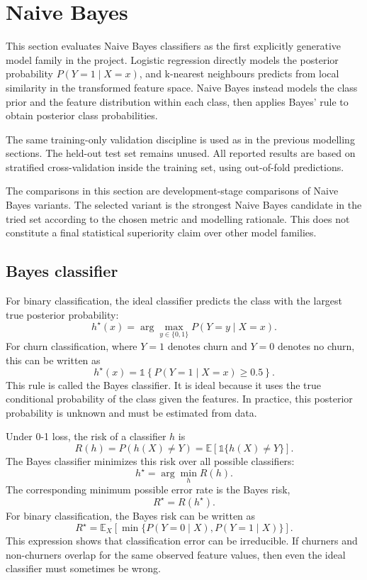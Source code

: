 \newpage
\section{Naive Bayes}
\label{sec:naive-bayes}

This section evaluates Naive Bayes classifiers as the first explicitly generative model family in the project. Logistic regression directly models the posterior probability \(P(Y=1\mid X=x)\), and k-nearest neighbours predicts from local similarity in the transformed feature space. Naive Bayes instead models the class prior and the feature distribution within each class, then applies Bayes' rule to obtain posterior class probabilities.

The same training-only validation discipline is used as in the previous modelling sections. The held-out test set remains unused. All reported results are based on stratified cross-validation inside the training set, using out-of-fold predictions.

The comparisons in this section are development-stage comparisons of Naive Bayes variants. The selected variant is the strongest Naive Bayes candidate in the tried set according to the chosen metric and modelling rationale. This does not constitute a final statistical superiority claim over other model families.

\subsection{Bayes classifier}

For binary classification, the ideal classifier predicts the class with the largest true posterior probability:
\[
h^\star(x)
=
\arg\max_{y\in\{0,1\}}
P(Y=y\mid X=x).
\]
For churn classification, where \(Y=1\) denotes churn and \(Y=0\) denotes no churn, this can be written as
\[
h^\star(x)
=
\mathbb{1}
\left\{
P(Y=1\mid X=x)\geq 0.5
\right\}.
\]
This rule is called the Bayes classifier. It is ideal because it uses the true conditional probability of the class given the features. In practice, this posterior probability is unknown and must be estimated from data.

Under 0-1 loss, the risk of a classifier \(h\) is
\[
R(h)
=
P(h(X)\neq Y)
=
\mathbb{E}
\left[
\mathbb{1}\{h(X)\neq Y\}
\right].
\]
The Bayes classifier minimizes this risk over all possible classifiers:
\[
h^\star
=
\arg\min_h R(h).
\]
The corresponding minimum possible error rate is the Bayes risk,
\[
R^\star
=
R(h^\star).
\]
For binary classification, the Bayes risk can be written as
\[
R^\star
=
\mathbb{E}_X
\left[
\min
\{
P(Y=0\mid X),
P(Y=1\mid X)
\}
\right].
\]
This expression shows that classification error can be irreducible. If churners and non-churners overlap for the same observed feature values, then even the ideal classifier must sometimes be wrong.

